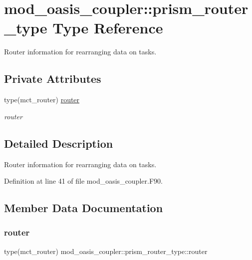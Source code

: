 \hypertarget{structmod__oasis__coupler_1_1prism__router__type}{}\section{mod\+\_\+oasis\+\_\+coupler\+:\+:prism\+\_\+router\+\_\+type Type Reference}
\label{structmod__oasis__coupler_1_1prism__router__type}


Router information for rearranging data on tasks.  


\subsection*{Private Attributes}
\begin{DoxyCompactItemize}
\item 
type(mct\+\_\+router) \hyperlink{structmod__oasis__coupler_1_1prism__router__type_aa898a44729c7578ab3b30f0826025f45}{router}
\begin{DoxyCompactList}\small\item\em router \end{DoxyCompactList}\end{DoxyCompactItemize}


\subsection{Detailed Description}
Router information for rearranging data on tasks. 

Definition at line 41 of file mod\+\_\+oasis\+\_\+coupler.\+F90.



\subsection{Member Data Documentation}
\mbox{\label{structmod__oasis__coupler_1_1prism__router__type_aa898a44729c7578ab3b30f0826025f45}} 
\subsubsection{\texorpdfstring{router}{router}}
{\footnotesize\ttfamily type(mct\+\_\+router) mod\+\_\+oasis\+\_\+coupler\+::prism\+\_\+router\+\_\+type\+::router\hspace{0.3cm}{\ttfamily [private]}}



